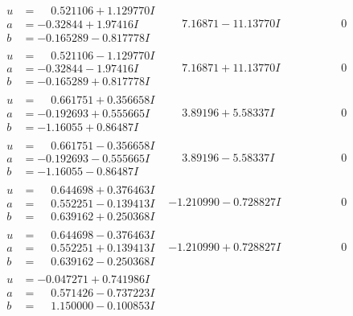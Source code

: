 \documentclass[1p]{elsarticle_modified}
\theoremstyle{definition}
\begin{document}
$$\begin{array}{c|c|c}
\begin{aligned}
u &= \phantom{-}0.521106 + 1.129770 I \\
a &= -0.32844 + 1.97416 I \\
b &= -0.165289 - 0.817778 I\end{aligned}
 & \phantom{-}7.16871 - 11.13770 I & \phantom{-0.000000 } 0 \\ \hline\begin{aligned}
u &= \phantom{-}0.521106 - 1.129770 I \\
a &= -0.32844 - 1.97416 I \\
b &= -0.165289 + 0.817778 I\end{aligned}
 & \phantom{-}7.16871 + 11.13770 I & \phantom{-0.000000 } 0 \\ \hline\begin{aligned}
u &= \phantom{-}0.661751 + 0.356658 I \\
a &= -0.192693 + 0.555665 I \\
b &= -1.16055 + 0.86487 I\end{aligned}
 & \phantom{-}3.89196 + 5.58337 I & \phantom{-0.000000 } 0 \\ \hline\begin{aligned}
u &= \phantom{-}0.661751 - 0.356658 I \\
a &= -0.192693 - 0.555665 I \\
b &= -1.16055 - 0.86487 I\end{aligned}
 & \phantom{-}3.89196 - 5.58337 I & \phantom{-0.000000 } 0 \\ \hline\begin{aligned}
u &= \phantom{-}0.644698 + 0.376463 I \\
a &= \phantom{-}0.552251 - 0.139413 I \\
b &= \phantom{-}0.639162 + 0.250368 I\end{aligned}
 & -1.210990 - 0.728827 I & \phantom{-0.000000 } 0 \\ \hline\begin{aligned}
u &= \phantom{-}0.644698 - 0.376463 I \\
a &= \phantom{-}0.552251 + 0.139413 I \\
b &= \phantom{-}0.639162 - 0.250368 I\end{aligned}
 & -1.210990 + 0.728827 I & \phantom{-0.000000 } 0 \\ \hline\begin{aligned}
u &= -0.047271 + 0.741986 I \\
a &= \phantom{-}0.571426 - 0.737223 I \\
b &= \phantom{-}1.150000 - 0.100853 I\end{aligned}

\end{array}$$
\end{document}
